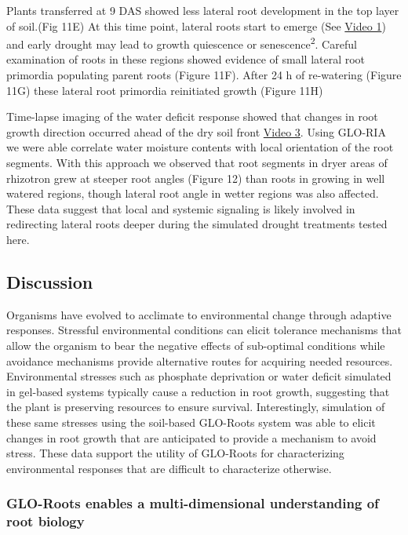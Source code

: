 \documentclass[]{article}
\begin{document}
Plants transferred at 9 DAS showed less lateral root development in the
top layer of soil.(Fig 11E) At this time point, lateral roots start to
emerge (See
\href{https://www.dropbox.com/s/sxjc04o0yj2faif/Video_1.avi?dl=0}{Video
1}) and early drought may lead to growth quiescence or
senescence\textsuperscript{2}. Careful examination of roots in these
regions showed evidence of small lateral root primordia populating
parent roots (Figure 11F). After 24 h of re-watering (Figure 11G) these
lateral root primordia reinitiated growth (Figure 11H)

Time-lapse imaging of the water deficit response showed that changes in
root growth direction occurred ahead of the dry soil front
\href{https://www.dropbox.com/s/x24x1uhvc8x0ou9/Video_3.avi?dl=0}{Video
3}. Using GLO-RIA we were able correlate water moisture contents with
local orientation of the root segments. With this approach we observed
that root segments in dryer areas of rhizotron grew at steeper root
angles (Figure 12) than roots in growing in well watered regions, though
lateral root angle in wetter regions was also affected. These data
suggest that local and systemic signaling is likely involved in
redirecting lateral roots deeper during the simulated drought treatments
tested here.

\subsection{Discussion}\label{discussion}

Organisms have evolved to acclimate to environmental change through
adaptive responses. Stressful environmental conditions can elicit
tolerance mechanisms that allow the organism to bear the negative
effects of sub-optimal conditions while avoidance mechanisms provide
alternative routes for acquiring needed resources. Environmental
stresses such as phosphate deprivation or water deficit simulated in
gel-based systems typically cause a reduction in root growth, suggesting
that the plant is preserving resources to ensure survival.
Interestingly, simulation of these same stresses using the soil-based
GLO-Roots system was able to elicit changes in root growth that are
anticipated to provide a mechanism to avoid stress. These data support
the utility of GLO-Roots for characterizing environmental responses that
are difficult to characterize otherwise.

\subsubsection{GLO-Roots enables a multi-dimensional understanding of
root
biology}\label{glo-roots-enables-a-multi-dimensional-understanding-of-root-biology}
\end{document}
